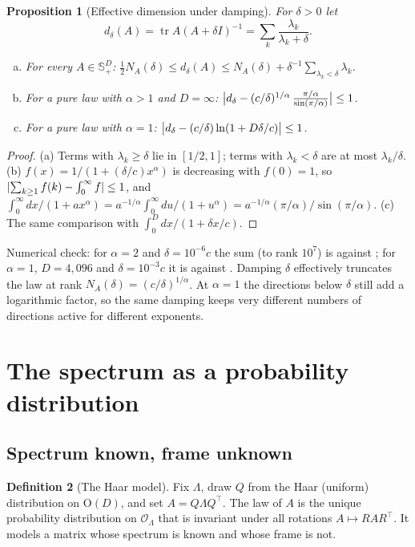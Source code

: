 \documentclass[11pt,a4paper]{article}
\newcommand{\Orth}{\mathrm{O}}
\newcommand{\Sym}{\mathbb{S}}
\DeclareMathOperator{\tr}{tr}
\DeclarePairedDelimiter{\abs}{\lvert}{\rvert}
\theoremstyle{plain}
\newtheorem{proposition}{Proposition}[section]
\theoremstyle{definition}
\newtheorem{definition}[proposition]{Definition}
\theoremstyle{remark}
\begin{document}
\begin{proposition}[Effective dimension under damping]\label{prop:deff}
For $\delta>0$ let
\[d_\delta(A)=\tr A(A+\delta I)^{-1}=\sum_k\frac{\lambda_k}{\lambda_k+\delta}.\]
\begin{enumerate}[(a)]
\item For every $A\in\Sym^D_+$: $\tfrac12N_A(\delta)\le d_\delta(A)\le N_A(\delta)+\delta^{-1}\sum_{\lambda_k<\delta}\lambda_k$.
\item For a pure law with $\alpha>1$ and $D=\infty$:
  $\abs[\big]{d_\delta-(c/\delta)^{1/\alpha}\,\frac{\pi/\alpha}{\sin(\pi/\alpha)}}\le1$.
\item For a pure law with $\alpha=1$: $\abs[\big]{d_\delta-(c/\delta)\ln(1+D\delta/c)}\le1$.
\end{enumerate}
\end{proposition}
\begin{proof}
(a) Terms with $\lambda_k\ge\delta$ lie in $[1/2,1]$; terms with $\lambda_k<\delta$ are at most $\lambda_k/\delta$.
(b) $f(x)=1/(1+(\delta/c)x^\alpha)$ is decreasing with $f(0)=1$, so $\abs{\sum_{k\ge1}f(k)-\int_0^\infty f}\le1$, and
$\int_0^\infty dx/(1+ax^\alpha)=a^{-1/\alpha}\int_0^\infty du/(1+u^\alpha)=a^{-1/\alpha}(\pi/\alpha)/\sin(\pi/\alpha)$.
(c) The same comparison with $\int_0^Ddx/(1+\delta x/c)$.
\end{proof}
Numerical check: for $\alpha=2$ and $\delta=10^{-6}c$ the sum (to rank $10^7$) is \NumDdeltaExact{} against
\NumDdeltaAsym; for $\alpha=1$, $D=4{,}096$ and $\delta=10^{-3}c$ it is \NumDdeltaLogExact{} against
\NumDdeltaLogAsym. Damping $\delta$ effectively truncates the law at rank $N_A(\delta)=(c/\delta)^{1/\alpha}$. At
$\alpha=1$ the directions below $\delta$ still add a logarithmic factor, so the same damping keeps very different
numbers of directions active for different exponents.

\section{The spectrum as a probability distribution}\label{sec:distribution}

\subsection{Spectrum known, frame unknown}

\begin{definition}[The Haar model]\label{def:haar}
Fix $\Lambda$, draw $Q$ from the Haar (uniform) distribution on $\Orth(D)$, and set $A=Q\Lambda Q^\top$. The law of
$A$ is the unique probability distribution on $\mathcal{O}_\Lambda$ that is invariant under all rotations
$A\mapsto RAR^\top$. It models a matrix whose spectrum is known and whose frame is not.
\end{definition}
\end{document}
